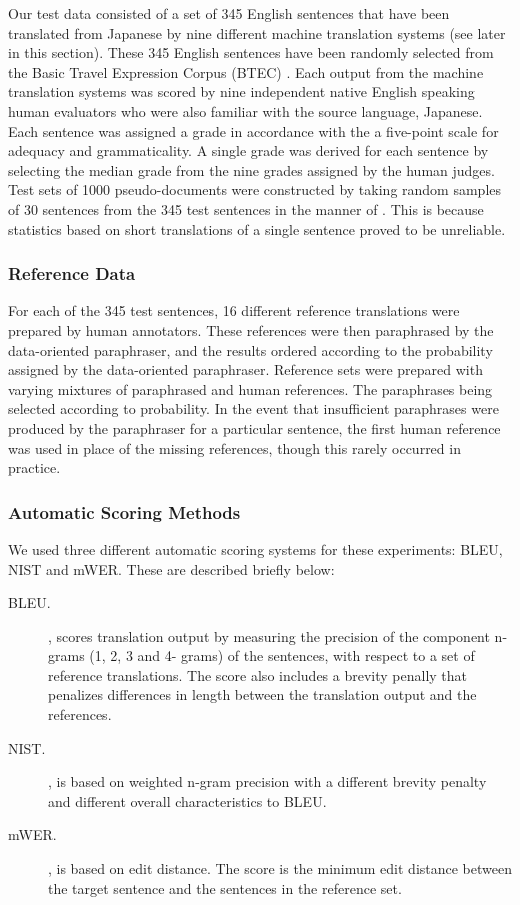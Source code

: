 Our test data consisted of a set of 345 English sentences that have been translated from Japanese by nine
different machine translation systems (see later in this section).  These 345 English sentences have been randomly
selected from the Basic Travel Expression Corpus (BTEC) \cite{Takezawa:02}. Each output from the machine
translation systems was scored by nine independent native English speaking human evaluators who were also
familiar with the source language, Japanese. Each sentence was assigned a grade in accordance with the a
five-point scale for adequacy and grammaticality. A single grade was derived for each sentence by selecting the
median grade from the nine grades assigned by the human judges. Test sets of 1000 pseudo-documents were
constructed by taking random samples of 30 sentences from the 345 test sentences in the manner of
\cite{Turian:03}. This is because statistics based on short translations of a single sentence proved to be
unreliable.


\subsubsection{Reference Data}

For each of the 345 test sentences, 16 different reference
translations were prepared by human annotators.
These references were then paraphrased by
the data-oriented paraphraser, and the results ordered
according to the probability assigned by the
data-oriented paraphraser. Reference sets were
prepared with varying mixtures of paraphrased
and human references. The paraphrases being selected
according to probability. In the event that
insufficient paraphrases were produced by the
paraphraser for a particular sentence, the first human
reference was used in place of the missing
references, though this rarely occurred in practice.

\subsubsection{Automatic Scoring Methods}

We used three different automatic scoring systems for these
experiments: BLEU, NIST and mWER. These are described briefly below:

\begin{description}
\item[BLEU.] \cite{Papineni:01},
scores translation output by measuring the precision
of the component n-grams (1, 2, 3 and 4-
grams) of the sentences, with respect to a set of
reference translations. The score also includes a
brevity penally that penalizes differences in length
between the translation output and the references.

\item[NIST.] \cite{Doddington:02},
is based on weighted n-gram precision with a different
brevity penalty and different overall characteristics
to BLEU.

\item[mWER.] \cite{Niessen:02},
is based on edit distance. The score is the minimum edit distance between the
target sentence and the sentences in the reference
set.
\end{description}

